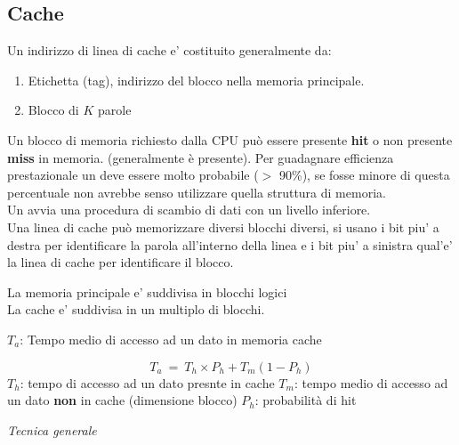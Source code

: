 \documentclass[arch.tex]{subfiles}
\begin{document}
\subsection{Cache}
Un indirizzo di linea di cache e' costituito generalmente da:
\begin{enumerate}
	\item Etichetta (tag), indirizzo del blocco nella memoria principale.
	\item Blocco di $K$ parole
\end{enumerate}

Un blocco di memoria richiesto dalla CPU può essere presente \textbf{hit} o non presente \textbf{miss} in memoria. (generalmente è presente). \newline
Per guadagnare efficienza prestazionale un  deve essere molto probabile ($>$ 90\%), 
se fosse minore di questa percentuale non avrebbe senso utilizzare quella struttura di memoria.\\
Un  avvia una procedura di scambio di dati con un livello inferiore.\\ 
Una linea di cache può memorizzare diversi blocchi diversi, si usano i bit piu' a destra
per identificare la parola all'interno della linea e i bit piu' a sinistra qual'e' 
la linea di cache per identificare il blocco.

\begin{defn}[Organizzazione]
La memoria principale e' suddivisa in blocchi logici\\
La cache e' suddivisa in un multiplo di blocchi.
\end{defn}

\begin{defn}
$T_a$: Tempo medio di accesso ad un dato in memoria cache 

\begin{equation} T_a\ =\ T_h \times P_h + T_m(1-P_h) \end{equation}
$T_h$: tempo di accesso ad un dato presnte in cache
$T_m$: tempo medio di accesso ad un dato \textbf{non} in cache (dimensione blocco)
$P_h$: probabilità di hit \\
\end{defn}
\textit{Tecnica generale} 
\end{document}
